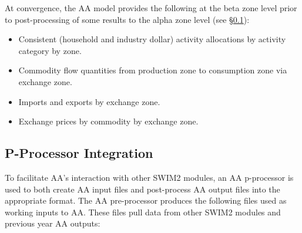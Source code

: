 At convergence, the AA model provides the following at the beta zone level prior to post-processing of some results to the alpha zone level (see \S\ref{sec:aa-p-processor}):
\begin{itemize}
\item Consistent (household and industry dollar) activity allocations by activity category by zone.
\item Commodity flow quantities from production zone to consumption zone via exchange zone.
\item Imports and exports by exchange zone.
\item Exchange prices by commodity by exchange zone. 
\end{itemize}

\subsection{P-Processor Integration}\label{sec:aa-p-processor}
To facilitate AA's interaction with other SWIM2 modules, an AA p-processor is used to both create AA input files and post-process AA output files into the appropriate format. The AA pre-processor produces the following files used as working inputs to AA. These files pull data from other SWIM2 modules and previous year AA outputs:
